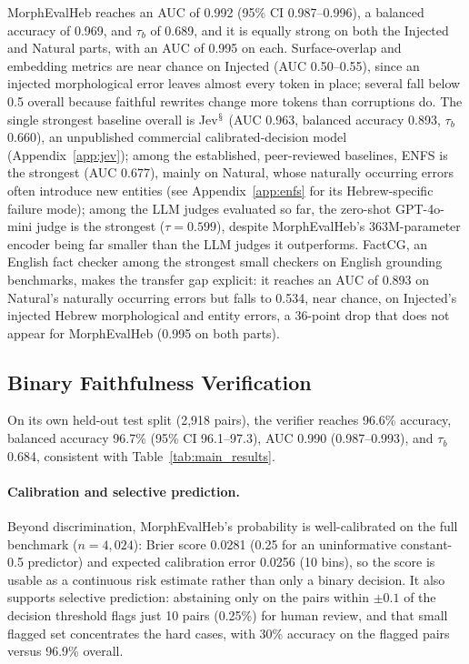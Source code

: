 \documentclass[11pt]{article}
\begin{document}
MorphEvalHeb reaches an AUC of 0.992 (95\% CI 0.987--0.996), a balanced accuracy of 0.969, and $\tau_b$ of 0.689, and it is equally strong on both the Injected and Natural parts, with an AUC of 0.995 on each. Surface-overlap and embedding metrics are near chance on Injected (AUC 0.50--0.55), since an injected morphological error leaves almost every token in place; several fall below 0.5 overall because faithful rewrites change more tokens than corruptions do. The single strongest baseline overall is Jev$^{\mathsection}$ (AUC 0.963, balanced accuracy 0.893, $\tau_b$ 0.660), an unpublished commercial calibrated-decision model (Appendix~\ref{app:jev}); among the established, peer-reviewed baselines, ENFS is the strongest (AUC 0.677), mainly on Natural, whose naturally occurring errors often introduce new entities (see Appendix~\ref{app:enfs} for its Hebrew-specific failure mode); among the LLM judges evaluated so far, the zero-shot GPT-4o-mini judge is the strongest ($\tau=0.599$), despite MorphEvalHeb's 363M-parameter encoder being far smaller than the LLM judges it outperforms. FactCG, an English fact checker among the strongest small checkers on English grounding benchmarks, makes the transfer gap explicit: it reaches an AUC of 0.893 on Natural's naturally occurring errors but falls to 0.534, near chance, on Injected's injected Hebrew morphological and entity errors, a 36-point drop that does not appear for MorphEvalHeb (0.995 on both parts).

\subsection{Binary Faithfulness Verification}
\label{sec:res_binary}
On its own held-out test split (2,918 pairs), the verifier reaches 96.6\% accuracy, balanced accuracy 96.7\% (95\% CI 96.1--97.3), AUC 0.990 (0.987--0.993), and $\tau_b$ 0.684, consistent with Table~\ref{tab:main_results}.

\paragraph{Calibration and selective prediction.} Beyond discrimination, MorphEvalHeb's probability is well-calibrated on the full benchmark ($n{=}4{,}024$): Brier score 0.0281 (0.25 for an uninformative constant-0.5 predictor) and expected calibration error 0.0256 (10 bins), so the score is usable as a continuous risk estimate rather than only a binary decision. It also supports selective prediction: abstaining only on the pairs within $\pm0.1$ of the decision threshold flags just 10 pairs (0.25\%) for human review, and that small flagged set concentrates the hard cases, with 30\% accuracy on the flagged pairs versus 96.9\% overall.
\end{document}
